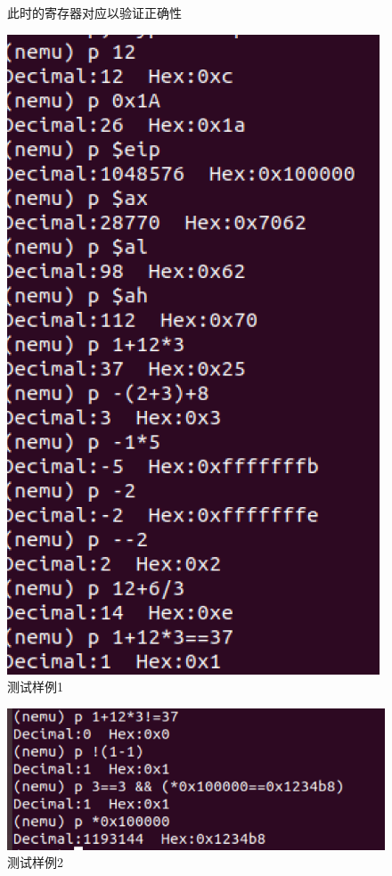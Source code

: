 \documentclass[UTF8,a4paper,10pt]{ctexart}
\begin{document}
{\begin{figure}[!h]
\begin{minipage}[h]{0.5\linewidth}
        \caption{此时的寄存器对应以验证正确性}
        \end{minipage}%
        \hfill
        \begin{minipage}[h]{0.5\linewidth}
        \centering
        \includegraphics[scale=0.4]{fig/24.png}
        \caption{测试样例1}
        \end{minipage}
    \end{figure}
    \begin{figure}[H]
        \centering
        \includegraphics[scale=0.45]{fig/22.png}
        \caption{测试样例2}
    \end{figure}
}
\end{document}
